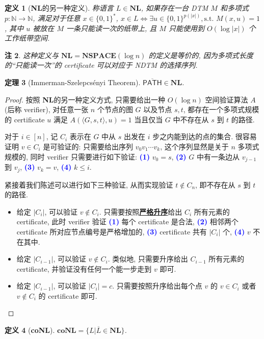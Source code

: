 \documentclass[8pt]{article}
\theoremstyle{compact}
\newtheorem{theorem}{定理}[section]
\newtheorem{definition}[theorem]{定义}
\newtheorem{remark}[theorem]{注}
\def\obj#1{\textbf{\uline{#1}}}
\def\num#1{\textnormal{\textbf{\mbox{\textcolor{blue}{(#1)}}}}}
\def\le{\leqslant}
\def\NSPACE{\textbf{NSPACE}}
\def\NL{\textbf{NL}}
\def\coNL{\textbf{coNL}}
\begin{document}
\begin{definition}[\NL 的另一种定义]
	称语言 $L \in \NL$, 如果存在一台 DTM $M$ 和多项式 $p: \mathbb N \to \mathbb N$, 满足对于任意 $x \in \{0, 1\}^*$, $x \in L \Leftrightarrow \exists u \in \{0, 1\}^{p(|x|)}, \text{s.t. } M(x, u) = 1$, 其中 $u$ 被放在 $M$ 一条只能读一次的纸带上, 且 $M$ 只能使用到 $O(\log |x|)$ 个工作纸带空间.
\end{definition}
\begin{remark}
	这种定义与 $\NL = \NSPACE(\log n)$ 的定义是等价的, 因为多项式长度的“只能读一次”的 certificate 可以对应于 NDTM 的选择序列.
\end{remark}
\begin{theorem}[Immerman-Szelepcsényi Theorem]
	$\overline{\textsf{PATH}} \in \NL$.
\end{theorem}
\begin{proof}
	按照 \NL 的另一种定义方式, 只需要给出一种 $O(\log n)$ 空间验证算法 $A$(后称 verifier), 对任意一张 $n$ 个节点的图 $G$ 以及节点 $s, t$, 都存在一个多项式规模的 certificate $u$ 满足 $A(\langle G, s, t \rangle, u) = 1$ 当且仅当 $G$ 中不存在从 $s$ 到 $t$ 的路径.

	对于 $i \in [n]$, 记 $C_i$ 表示在 $G$ 中从 $s$ 出发在 $i$ 步之内能到达的点的集合. 很容易证明 $v \in C_i$ 是可验证的: 只需要给出序列 $v_0v_1 \cdots v_k$, 这个序列显然是关于 $n$ 多项式规模的, 同时 verifier 只需要进行如下验证: \num{1} $v_0 = s$, \num{2} $G$ 中有一条边从 $v_{j-1}$ 到 $v_j$, \num{3} $v_k = v$, \num{4} $k \le i$. 

	紧接着我们陈述可以进行如下三种验证, 从而实现验证 $t \notin C_n$, 即不存在从 $s$ 到 $t$ 的路径.
	\begin{itemize}
		\item 给定 $|C_i|$, 可以验证 $v \notin C_i$. 只需要按照\obj{严格升序}给出 $C_i$ 所有元素的 certificate, 此时 verifier 验证 \num{1} 每个 certificate 是合法, \num{2} 相邻两个 certificate 所对应节点编号是严格增加的, \num{3} certificate 共有 $|C_i|$ 个, \num{4} $v$ 不在其中.
		\item 给定 $|C_{i-1}|$, 可以验证 $v \notin C_i$. 类似地, 只需要升序给出 $C_{i-1}$ 所有元素的 certificate, 并验证没有任何一个能一步走到 $v$ 即可.
		\item 给定 $|C_{i-1}|$, 可以验证 $|C_i| = c$. 只需要按照升序给出每个点 $v$ 的 $v \in C_i$ 或者 $v \notin C_i$ 的 certificate 即可.
	\end{itemize}
\end{proof}

\begin{definition}[\coNL]
	$\coNL = \{L | \overline{L} \in \NL\}$.
\end{definition}
\end{document}

